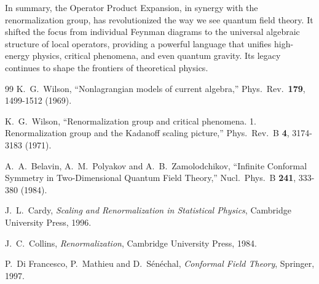 \documentclass[11pt]{article}
\begin{document}
In summary, the Operator Product Expansion, in synergy with the renormalization group, has revolutionized the way we see quantum field theory. It shifted the focus from individual Feynman diagrams to the universal algebraic structure of local operators, providing a powerful language that unifies high-energy physics, critical phenomena, and even quantum gravity. Its legacy continues to shape the frontiers of theoretical physics.

\begin{thebibliography}{99}
K.~G.~Wilson,
``Nonlagrangian models of current algebra,''
Phys.\ Rev.\ \textbf{179}, 1499-1512 (1969).

K.~G.~Wilson,
``Renormalization group and critical phenomena. 1. Renormalization group and the Kadanoff scaling picture,''
Phys.\ Rev.\ B \textbf{4}, 3174-3183 (1971).

A.~A.~Belavin, A.~M.~Polyakov and A.~B.~Zamolodchikov,
``Infinite Conformal Symmetry in Two-Dimensional Quantum Field Theory,''
Nucl.\ Phys.\ B \textbf{241}, 333-380 (1984).

J.~L.~Cardy,
\textit{Scaling and Renormalization in Statistical Physics},
Cambridge University Press, 1996.

J.~C.~Collins,
\textit{Renormalization},
Cambridge University Press, 1984.

P.~Di Francesco, P.~Mathieu and D.~S\'en\'echal,
\textit{Conformal Field Theory},
Springer, 1997.
\end{thebibliography}
\end{document}
